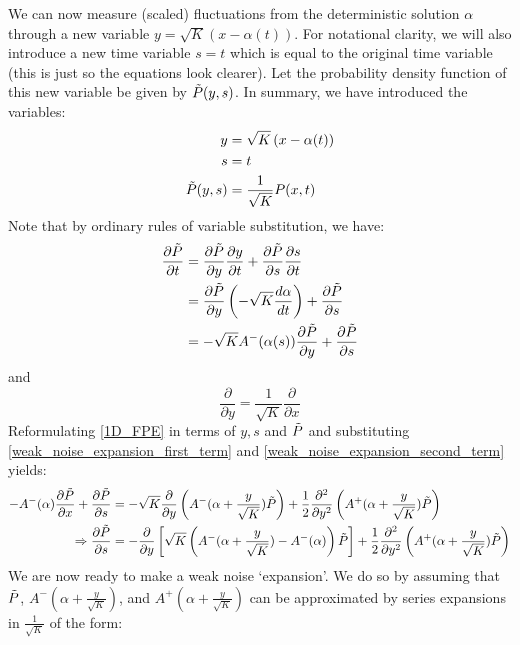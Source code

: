 We can now measure (scaled) fluctuations from the deterministic solution $\alpha$ through a new variable $y=\sqrt{K}\left(x-\alpha(t)\right)$. For notational clarity, we will also introduce a new time variable $s=t$ which is equal to the original time variable (this is just so the equations look clearer). Let the probability density function of this new variable be given by $\Tilde{P}(y,s)$. In summary, we have introduced the variables:
\begin{align*}
    y &= \sqrt{K}\left(x-\alpha(t)\right)\\
    s &= t\\
    \Tilde{P}(y,s) &= \frac{1}{\sqrt{K}}P(x,t)
\end{align*}
Note that by ordinary rules of variable substitution, we have:
\begin{align}
    \frac{\partial \Tilde{P}}{\partial t} &= \frac{\partial \Tilde{P}}{\partial y}\frac{\partial y}{\partial t} + \frac{\partial \Tilde{P}}{\partial s}\frac{\partial s}{\partial t}\nonumber\\
    &=\frac{\partial \Tilde{P}}{\partial y}\left( -\sqrt{K}\frac{d\alpha}{dt}\right) + \frac{\partial \Tilde{P}}{\partial s}\nonumber\\
    &= -\sqrt{K}A^{-}(\alpha(s))\frac{\partial \Tilde{P}}{\partial y} + \frac{\partial \Tilde{P}}{\partial s}\label{weak_noise_expansion_first_term}
\end{align}
and
\begin{equation}
\label{weak_noise_expansion_second_term}
    \frac{\partial }{\partial y} = \frac{1}{\sqrt{K}}\frac{\partial }{\partial x}
\end{equation}
Reformulating \eqref{1D_FPE} in terms of $y,s$ and $\Tilde{P}$ and substituting \eqref{weak_noise_expansion_first_term} and \eqref{weak_noise_expansion_second_term} yields:
\begin{align}
-A^-(\alpha)\frac{\partial\Tilde{P}}{\partial x} + \frac{\partial \Tilde{P}}{\partial s} &= -\sqrt{K}\frac{\partial}{\partial y}\left(A^-(\alpha+\frac{y}{\sqrt{K}})\Tilde{P}\right)+\frac{1}{2}\frac{\partial^2}{\partial y^2}\left(A^+(\alpha+\frac{y}{\sqrt{K}})\Tilde{P}\right)\nonumber\\
\Rightarrow \frac{\partial \Tilde{P}}{\partial s} &= -\frac{\partial}{\partial y}\left[\sqrt{K}\left(A^-(\alpha+\frac{y}{\sqrt{K}})-A^-(\alpha)\right)\Tilde{P}\right]+\frac{1}{2}\frac{\partial^2}{\partial y^2}\left(A^+(\alpha+\frac{y}{\sqrt{K}})\Tilde{P}\right)\label{weak_noise_exact_equation}
\end{align}
We are now ready to make a weak noise `expansion'. We do so by assuming that $\Tilde{P}$, $A^-(\alpha + \frac{y}{\sqrt{K}})$, and $A^+(\alpha+\frac{y}{\sqrt{K}})$ can be approximated by series expansions in $\frac{1}{\sqrt{K}}$ of the form:

